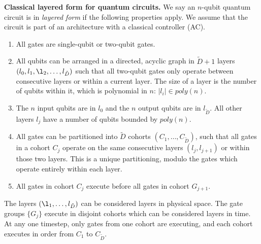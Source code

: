 \begin{definition}{\textbf{Classical layered form for quantum circuits.}}
We say an $n$-qubit quantum circuit is in \emph{layered form} if the following
properties apply. We assume that the circuit is part of an architecture
with a classical controller (\textsf{AC}).

\begin{enumerate}
\item
All gates are single-qubit or two-qubit gates.
\item
All qubits can be arranged in a directed, acyclic graph in $\tilde{D}+1$
layers $(l_0, l_1, \l_2, \ldots, l_{\tilde{D}})$
such that all two-qubit gates only operate between consecutive layers or
within a current layer. The size of a layer is the number of qubits within it,
which is polynomial in $n$: $|l_i| \in poly(n)$.
\item The $n$ input qubits are in $l_0$ and the $n$ output qubits are
in $l_{\tilde{D}}$. All other layers $l_j$ have a number of qubits
bounded by $poly(n)$.
\item All gates can be partitioned into $\tilde{D}$ cohorts $(C_1, \ldots, C_{\tilde{D}})$,
such that all gates in a cohort $C_j$
operate on the same consecutive layers $(l_{j}, l_{j+1})$
or within those two layers.
This is a unique partitioning, modulo the gates which operate entirely within each layer.

\item
All gates in cohort $C_j$ execute before all gates in cohort $G_{j+1}$.
\end{enumerate}
\label{def:lqc}
\end{definition}

The layers $(\l_1, \ldots, l_{\tilde{D}})$ can be considered layers in
physical space.
The gate groups $\{ G_j \}$ execute in disjoint cohorts which can be considered
layers in time. At any one timestep, only gates from one cohort are executing,
and each cohort executes in order from $C_1$ to $C_{\tilde{D}}$.

